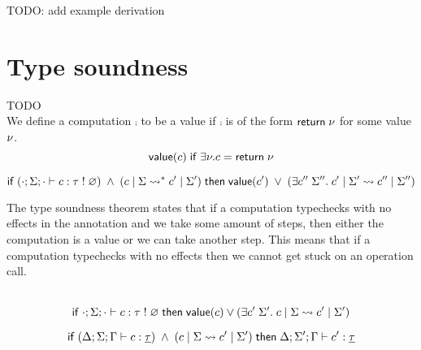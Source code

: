 {TODO: add example derivation

\section{Type soundness}
\label{sec:theorems}

TODO \\
We define a computation $\comp$ to be a value if $\comp$ is of the form $\mathsf{return} \; \nu$ for some value $\nu$.
	\[ \mathsf{value}(c) \;\mathsf{if}\; \exists \nu. c = \mathsf{return} \; \nu \]

\begin{theorem}
\[
	\mathsf{if}\;
		(\cdot;\Sigma;\cdot \vdash c : \tau \; ! \; \varnothing)
		\;\land\;
		(c \;|\; \Sigma \rightsquigarrow^* c' \;|\; \Sigma')
	\;\mathsf{then}\;
		\mathsf{value}(c')
		\;\lor\;
		(\exists c'' \; \Sigma''.\; c' \;|\; \Sigma' \rightsquigarrow c'' \;|\; \Sigma'')
\]
\end{theorem}

The type soundness theorem states that if a computation typechecks with no effects in the annotation and we take some amount of steps, then either the computation is a value or we can take another step.
This means that if a computation typechecks with no effects then we cannot get stuck on an operation call.
\\\\

\begin{lemma}[Progress]
\[
	\mathsf{if}\;
		\cdot;\Sigma;\cdot \vdash c : \tau \; ! \; \varnothing
	\;\mathsf{then}\;
		\mathsf{value}(c)
		\lor
		(\exists c' \; \Sigma'.\; c \;|\; \Sigma \rightsquigarrow c' \;|\; \Sigma')
\]
\end{lemma}



\begin{lemma}[Preservation]
\[
	\mathsf{if}\;
		(\Delta;\Sigma;\Gamma \vdash c : \underline{\tau})
		\;\land\;
		(c \;|\; \Sigma \rightsquigarrow c' \;|\; \Sigma')
	\;\mathsf{then}\;
		\Delta;\Sigma';\Gamma \vdash c' : \underline{\tau}
\]
\end{lemma}

}
